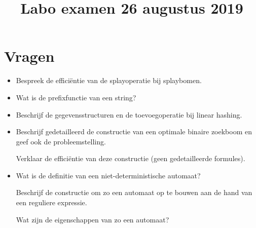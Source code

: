 \documentclass{article}
\title{Labo examen 26 augustus 2019}
\author{}
\begin{document}
    \maketitle 


    \section*{Vragen}

    \begin{itemize}
        \item Bespreek de efficiëntie van de splayoperatie bij splaybomen.
        \item Wat is de prefixfunctie van een string?
        \item Beschrijf de gegevensstructuren en de toevoegoperatie bij linear hashing.
        \item Beschrijf gedetailleerd de constructie van een optimale binaire zoekboom en geef ook de probleemstelling.

        Verklaar de efficiëntie van deze constructie (geen gedetailleerde formules).
        \item Wat is de definitie van een niet-deterministische automaat?
        
        Beschrijf de constructie om zo een automaat op te bouwen aan de hand van een reguliere expressie.
    
        Wat zijn de eigenschappen van zo een automaat?
    \end{itemize}
\end{document}
